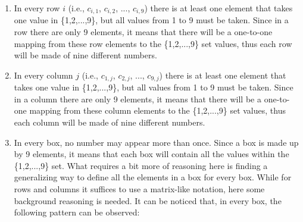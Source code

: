 \documentclass[]{usiinfprospectus}
\newcounter{row}
\newcounter{col}
\begin{document}
\begin{enumerate}[label={(\arabic*)}]
\item In every row $i$ (i.e., $c_{i,1}$, $c_{i,2}$, ..., $c_{i,9}$) there is at least one element that takes one value in \{1,2,...,9\}, but all values from 1 to 9 must be taken. Since in a row there are only 9 elements, it means that there will be a one-to-one mapping from these row elements to the \{1,2,...,9\} set values, thus each row will be made of nine different numbers.
\item In every column $j$ (i.e., $c_{1,j}$, $c_{2,j}$, ..., $c_{9,j}$) there is at least one element that takes one value in \{1,2,...,9\}, but all values from 1 to 9 must be taken. Since in a column there are only 9 elements, it means that there will be a one-to-one mapping from these column elements to the \{1,2,...,9\} set values, thus each column will be made of nine different numbers.
\item In every box, no number may appear more than once. Since a box is made up by 9 elements, it means that each box will contain all the values within the \{1,2,...,9\} set. What requires a bit more of reasoning here is finding a generalizing way to define all the elements in a box for every box. While for rows and columns it suffices to use a matrix-like notation, here some background reasoning is needed. It can be noticed that, in every box, the following pattern can be observed:
\begin{figure}[h]
\begin{center}
\end{center}
\end{figure}
\end{enumerate}
\end{document}
